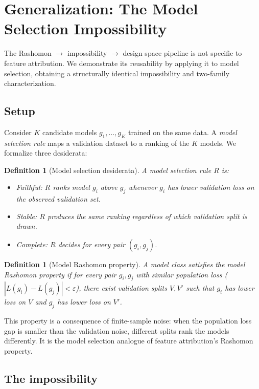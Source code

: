 \documentclass{article}
\newtheorem{definition}[theorem]{Definition}
\begin{document}
\section{Generalization: The Model Selection Impossibility}

The Rashomon $\to$ impossibility $\to$ design space pipeline is not
specific to feature attribution. We demonstrate its reusability by
applying it to model selection, obtaining a structurally identical
impossibility and two-family characterization.

\subsection{Setup}

Consider $K$ candidate models $g_1, \ldots, g_K$ trained on the same
data. A \emph{model selection rule} maps a validation dataset to a
ranking of the $K$ models. We formalize three desiderata:

\begin{definition}[Model selection desiderata]
A model selection rule $R$ is:
\begin{itemize}
    \item \emph{Faithful}: $R$ ranks model $g_i$ above $g_j$ whenever
      $g_i$ has lower validation loss on the observed validation set.
    \item \emph{Stable}: $R$ produces the same ranking regardless of
      which validation split is drawn.
    \item \emph{Complete}: $R$ decides for every pair $(g_i, g_j)$.
\end{itemize}
\end{definition}

\begin{definition}[Model Rashomon property]
A model class satisfies the \emph{model Rashomon property} if for
every pair $g_i, g_j$ with similar population loss
($|L(g_i) - L(g_j)| < \varepsilon$), there exist validation splits
$V, V'$ such that $g_i$ has lower loss on $V$ and $g_j$ has lower
loss on $V'$.
\end{definition}

This property is a consequence of finite-sample noise: when the
population loss gap is smaller than the validation noise, different
splits rank the models differently. It is the model selection
analogue of feature attribution's Rashomon property.

\subsection{The impossibility}
\end{document}
